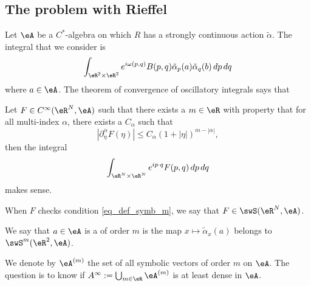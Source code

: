 \subsection{The problem with Rieffel}


Let $\eA$ be a $C^*$-algebra on which $R$ has a strongly continuous action $\tilde\alpha$. The integral that we consider is
\[ 
  \int_{\eR^2\times\eR^2}e^{i\omega(p,q)}B(p,q)\tilde\alpha_p(a)\tilde\alpha_q(b)\,dp\,dq
\]
where $a\in\eA$. The theorem of convergence of oscillatory integrals says that

\begin{theorem}
Let $F\in C^{\infty}(\eR^N,\eA)$ such that there exists a $m\in\eR$ with property that for all multi-index $\alpha$, there exists a $C_{\alpha}$ such that
\begin{equation} \label{eq_def_symb_m}
  | \partial^{\alpha}_{\eta}F(\eta) |\leq C_{\alpha}(1+| \eta |)^{m-| \alpha |},  
\end{equation}
then the integral
\[ 
  \int_{\eR^N\times\eR^N} e^{ip\cdot q}F(p,q)\,dp\,dq
\]
makes sense.

\end{theorem}
When $F$ checks condition \eqref{eq_def_symb_m}, we say that $F\in\swS(\eR^N,\eA)$. 

\begin{definition}
We say that $a\in\eA$ is a  of order $m$ is the map $x\mapsto\tilde\alpha_x(a)$ belongs to $\swS^m(\eR^2,\eA)$.
\end{definition}
We denote by $\eA^{(m)}$ the set of all symbolic vectors of order $m$ on $\eA$. The question is to know if $A^{\infty}:=\bigcup_{m\in\eR}\eA^{(m)}$ is at least dense in $\eA$.


